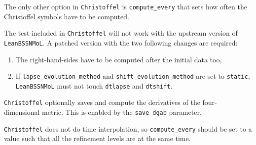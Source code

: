 The only other option in \texttt{Christoffel} is \texttt{compute_every} that
sets how often the Christoffel symbols have to be computed.

The test included in \texttt{Christoffel} will not work with the upstream
version of \texttt{LeanBSSNMoL}. A patched version with the two following
changes are required:
\begin{enumerate}
  \item The right-hand-sides have to be computed after the initial data too,
  \item If \texttt{lapse_evolution_method} and \texttt{shift_evolution_method} are
  set to \texttt{static}, \texttt{LeanBSSNMoL} must not touch \texttt{dtlapse}
  and \texttt{dtshift}.
\end{enumerate}

\texttt{Christoffel} optionally saves and compute the derivatives of the
four-dimensional metric. This is enabled by the \texttt{save_dgab} parameter.

\texttt{Christoffel} does not do time interpolation, so \texttt{compute_every}
should be set to a value such that all the refinement levels are at the same
time.





